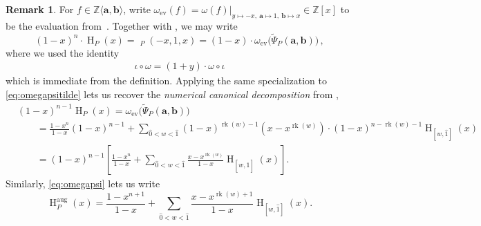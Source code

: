 \documentclass[a4paper, english,reqno, 11pt]{amsart}
\theoremstyle{plain}
\theoremstyle{definition}
\newtheorem{remark}[theorem]{Remark}
\DeclareMathOperator{\rk}{rk}
\newcommand{\Chow}{\operatorname{H}}
\newcommand{\Chowaug}{\operatorname{H}^{\operatorname{aug}}}
\DeclareMathOperator{\expsitilde}{ex\widetilde{\Psi}}
\newcommand{\zero}{\widehat{0}}
\newcommand{\one}{\widehat{1}}
\newcommand{\aaa}{\mathbf{a}}
\newcommand{\bbb}{\mathbf{b}}
\newcommand{\ZZ}{\mathbb{Z}}
\begin{document}
\begin{remark}
\label{rem:omegaeval}
    For $f \in \ZZ\langle\aaa,\bbb\rangle$, write $\omega_{\operatorname{ev}}(f) = \omega(f)\big|_{y \mapsto -x,\ \aaa\mapsto 1,\ \bbb\mapsto x} \in \ZZ[x]$ to be the evaluation from~\cite[Theorem~2.6]{Stump}.
    Together with , we may write
    \[
    (1-x)^n\cdot\Chow_P(x) = \expsitilde_P(-x,1,x) = (1-x)\cdot\omega_{\operatorname{ev}}\big(\widetilde\Psi_P(\aaa,\bbb)\big)\,,
    \]
    where we used the identity 
    \begin{align}
        \iota \circ \omega = (1+y) \cdot \omega\circ \iota \label{eq:omegaiota}
    \end{align}
    which is immediate from the definition.
    Applying the same specialization to  \eqref{eq:omegapsitilde} lets us recover the \emph{numerical canonical decomposition} from \cite[Theorem~3.9(15)]{ferroni-matherne-vecchi},
    \begin{align*}
        &(1-x)^{n-1}\Chow_P(x) =\omega_{\operatorname{ev}}\big(\widetilde\Psi_P(\aaa,\bbb)\big)\\[5pt]
        &\qquad= \frac{1-x^n}{1-x}(1-x)^{n-1} + \sum_{\zero < w < \one} (1-x)^{\rk(w) -1}(x-x^{\rk(w)})\cdot (1-x)^{n-\rk(w) - 1}\Chow_{[w,\one]}(x) \\
        &\qquad= (1-x)^{n-1}\left[ \frac{1-x^{n}}{1-x} + \sum_{\zero< w < \one}\frac{x-x^{\rk(w)}}{1-x}\Chow_{[w,\one]}(x) \right].
    \end{align*}
    Similarly, \eqref{eq:omegapsi} lets us write
    \[
    \Chowaug_P(x) = \frac{1-x^{n+1}}{1-x} + \sum_{\zero < w < \one}\frac{x-x^{\rk(w)+1}}{1-x}\Chow_{[w,\one]}(x).
    \]
\end{remark}
\end{document}
